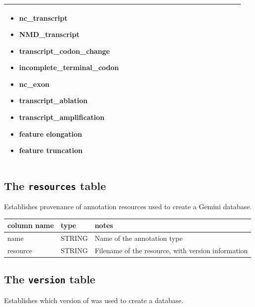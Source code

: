 \documentclass[letterpaper,10pt,english]{sphinxmanual}
\begin{document}
\begin{tabular}{|p{0.475\linewidth}|p{0.475\linewidth}|}
\begin{itemize}
\item {} 
nc\_transcript

\item {} 
NMD\_transcript

\item {} 
transcript\_codon\_change

\item {} 
incomplete\_terminal\_codon

\item {} 
nc\_exon

\item {} 
transcript\_ablation

\item {} 
transcript\_amplification

\item {} 
feature elongation

\item {} 
feature truncation

\end{itemize}
\\\hline
\end{tabular}



\subsection{The \texttt{resources} table}
\label{content/database_schema:the-resources-table}
Establishes provenance of annotation resources used to create a Gemini database.

\begin{tabulary}{\linewidth}{|L|L|L|}
\hline
\textbf{
column name
} & \textbf{
type
} & \textbf{
notes
}\\\hline

name
 & 
STRING
 & 
Name of the annotation type
\\\hline

resource
 & 
STRING
 & 
Filename of the resource, with version information
\\\hline
\end{tabulary}



\subsection{The \texttt{version} table}
\label{content/database_schema:the-version-table}
Establishes which version of  was used to create a database.
\end{document}
